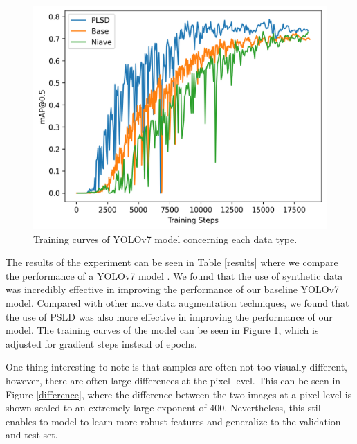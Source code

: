 \documentclass{article}
\begin{document}
\begin{figure}[ht]
    \vskip -0.1in
    \begin{center}
        \centerline{\includegraphics[width=\columnwidth]{training.png}}
        \caption{Training curves of YOLOv7 model concerning each data type.}
        \label{training_curves}
    \end{center}
    \vskip -0.3in
\end{figure}


The results of the experiment can be seen in Table \ref{results} where we compare the performance of a YOLOv7 model \cite{wang2023yolov7}. We found that 
the use of synthetic data was incredibly effective in improving the performance of our baseline YOLOv7 model. Compared with other naive data augmentation techniques,
we found that the use of PSLD was also more effective in improving the performance of our model. The training curves of the model can be seen in 
Figure \ref{training_curves}, which is adjusted for gradient steps instead of epochs.

One thing interesting to note is that samples are often not too visually different, however, there are often large differences at the pixel level.
This can be seen in Figure \ref{difference}, where the difference between the two images at a pixel level is shown scaled to an extremely large exponent of 400.
Nevertheless, this still enables to model to learn more robust features and generalize to the validation and test set.
\end{document}
